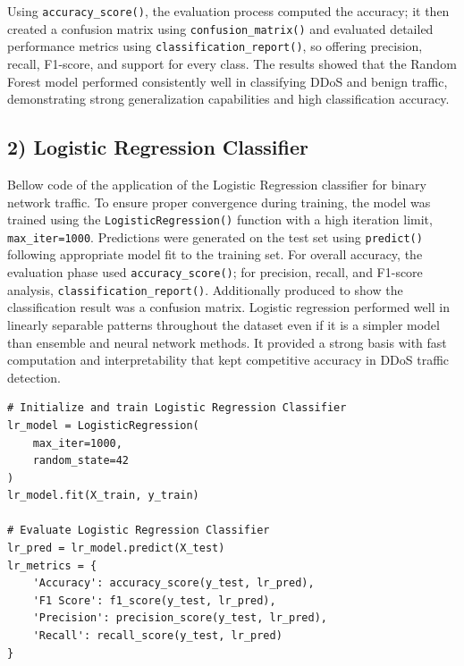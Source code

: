 \documentclass[conference]{IEEEtran}
\begin{document}
Using \texttt{accuracy\_score()}, the evaluation process computed the accuracy; it then created a confusion matrix using \texttt{confusion\_matrix()} and evaluated detailed performance metrics using \texttt{classification\_report()}, so offering precision, recall, F1-score, and support for every class. The results showed that the Random Forest model performed consistently well in classifying DDoS and benign traffic, demonstrating strong generalization capabilities and high classification accuracy.



\subsection*{2) Logistic Regression Classifier}

Bellow code of the application of the Logistic Regression classifier for binary network traffic. To ensure proper convergence during training, the model was trained using the \texttt{LogisticRegression()} function with a high iteration limit, \texttt{max\_iter=1000}. Predictions were generated on the test set using \texttt{predict()} following appropriate model fit to the training set. For overall accuracy, the evaluation phase used \texttt{accuracy\_score()}; for precision, recall, and F1-score analysis, \texttt{classification\_report()}. Additionally produced to show the classification result was a confusion matrix. Logistic regression performed well in linearly separable patterns throughout the dataset even if it is a simpler model than ensemble and neural network methods. It provided a strong basis with fast computation and interpretability that kept competitive accuracy in DDoS traffic detection.

\begin{center}
\begin{scriptsize}
\begin{verbatim}
# Initialize and train Logistic Regression Classifier
lr_model = LogisticRegression(
    max_iter=1000,
    random_state=42
)
lr_model.fit(X_train, y_train)

# Evaluate Logistic Regression Classifier
lr_pred = lr_model.predict(X_test)
lr_metrics = {
    'Accuracy': accuracy_score(y_test, lr_pred),
    'F1 Score': f1_score(y_test, lr_pred),
    'Precision': precision_score(y_test, lr_pred),
    'Recall': recall_score(y_test, lr_pred)
}
\end{verbatim}
\end{scriptsize}
\end{center}
\end{document}

